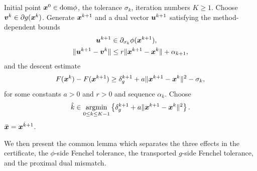 \documentclass[english]{article}
\begin{document}
\begin{algorithm}[tbp]
    \caption{\textbf{Proximal DCA}}
    \label{alg:certified-prox-dca}
    \begin{algorithmic}[1]
         Initial point
        $\bm{x}^0\in\mathrm{dom}\phi$, the tolerance $\sigma_k$, iteration numbers $K\ge1$. 
            \STATE Choose $\bm{v}^k\in\partial g(\bm{x}^k)$.
            \STATE Generate $\bm{x}^{k+1}$ and a dual vector
            $\bm{u}^{k+1}$ satisfying the method-dependent bounds
            \begin{align}
                \bm{u}^{k+1}
                &\in
                \partial_{\sigma_k}\phi(\bm{x}^{k+1}),
                \label{eq:abstract-prox-phi-cert}
                \\
                \|\bm{u}^{k+1}-\bm{v}^k\|
                &\le
                r\|\bm{x}^{k+1}-\bm{x}^k\|+\alpha_{k+1},
                \label{eq:abstract-prox-dual-residual}
            \end{align}
            and the descent estimate
            \begin{equation}
                F(\bm{x}^k)-F(\bm{x}^{k+1})
                \ge
                \delta_g^{k+1}
                +a\|\bm{x}^{k+1}-\bm{x}^k\|^2
                -\sigma_k ,
                \label{eq:abstract-prox-descent}
            \end{equation}
            for some constants $a>0$ and $r>0$ and sequence $\alpha_k$.
        \ENDFOR
        \STATE Choose
        \[
            \hat k
            \in
            \operatorname*{\mathrm{argmin}}_{0\le k\le K-1}
            \left\{
                \delta_g^{k+1}
                +a\|\bm{x}^{k+1}-\bm{x}^k\|^2
            \right\}.
        \]
         $\bar{\bm{x}}=\bm{x}^{\hat k+1}$.
    \end{algorithmic}
\end{algorithm}

We then present the common lemma which  separates the three effects in the certificate, the $\phi$-side Fenchel tolerance, the transported $g$-side Fenchel tolerance, and the proximal dual mismatch.
\end{document}
